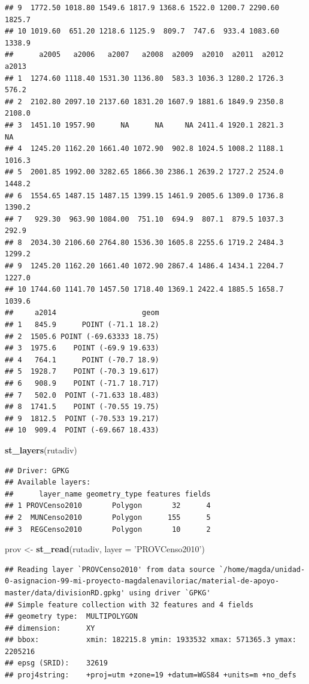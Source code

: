 \documentclass[11pt,]{article}
\newenvironment{Shaded}{\begin{snugshade}}{\end{snugshade}}
\newcommand{\KeywordTok}[1]{\textcolor[rgb]{0.13,0.29,0.53}{\textbf{#1}}}
\newcommand{\DataTypeTok}[1]{\textcolor[rgb]{0.13,0.29,0.53}{#1}}
\newcommand{\StringTok}[1]{\textcolor[rgb]{0.31,0.60,0.02}{#1}}
\newcommand{\NormalTok}[1]{#1}
\begin{document}
\begin{verbatim}
## 9  1772.50 1018.80 1549.6 1817.9 1368.6 1522.0 1200.7 2290.60 1825.7
## 10 1019.60  651.20 1218.6 1125.9  809.7  747.6  933.4 1083.60 1338.9
##      a2005   a2006   a2007   a2008  a2009  a2010  a2011  a2012  a2013
## 1  1274.60 1118.40 1531.30 1136.80  583.3 1036.3 1280.2 1726.3  576.2
## 2  2102.80 2097.10 2137.60 1831.20 1607.9 1881.6 1849.9 2350.8 2108.0
## 3  1451.10 1957.90      NA      NA     NA 2411.4 1920.1 2821.3     NA
## 4  1245.20 1162.20 1661.40 1072.90  902.8 1024.5 1008.2 1188.1 1016.3
## 5  2001.85 1992.00 3282.65 1866.30 2386.1 2639.2 1727.2 2524.0 1448.2
## 6  1554.65 1487.15 1487.15 1399.15 1461.9 2005.6 1309.0 1736.8 1390.2
## 7   929.30  963.90 1084.00  751.10  694.9  807.1  879.5 1037.3  292.9
## 8  2034.30 2106.60 2764.80 1536.30 1605.8 2255.6 1719.2 2484.3 1299.2
## 9  1245.20 1162.20 1661.40 1072.90 2867.4 1486.4 1434.1 2204.7 1227.0
## 10 1744.60 1141.70 1457.50 1718.40 1369.1 2422.4 1885.5 1658.7 1039.6
##     a2014                    geom
## 1   845.9      POINT (-71.1 18.2)
## 2  1505.6 POINT (-69.63333 18.75)
## 3  1975.6    POINT (-69.9 19.633)
## 4   764.1      POINT (-70.7 18.9)
## 5  1928.7    POINT (-70.3 19.617)
## 6   908.9    POINT (-71.7 18.717)
## 7   502.0  POINT (-71.633 18.483)
## 8  1741.5    POINT (-70.55 19.75)
## 9  1812.5  POINT (-70.533 19.217)
## 10  909.4  POINT (-69.667 18.433)
\end{verbatim}

\begin{Shaded}
\begin{Highlighting}[]
\KeywordTok{st_layers}\NormalTok{(rutadiv)}
\end{Highlighting}
\end{Shaded}

\begin{verbatim}
## Driver: GPKG 
## Available layers:
##      layer_name geometry_type features fields
## 1 PROVCenso2010       Polygon       32      4
## 2  MUNCenso2010       Polygon      155      5
## 3  REGCenso2010       Polygon       10      2
\end{verbatim}

\begin{Shaded}
\begin{Highlighting}[]
\NormalTok{prov <-}\StringTok{ }\KeywordTok{st_read}\NormalTok{(rutadiv, }\DataTypeTok{layer =} \StringTok{'PROVCenso2010'}\NormalTok{)}
\end{Highlighting}
\end{Shaded}

\begin{verbatim}
## Reading layer `PROVCenso2010' from data source `/home/magda/unidad-0-asignacion-99-mi-proyecto-magdalenaviloriac/material-de-apoyo-master/data/divisionRD.gpkg' using driver `GPKG'
## Simple feature collection with 32 features and 4 fields
## geometry type:  MULTIPOLYGON
## dimension:      XY
## bbox:           xmin: 182215.8 ymin: 1933532 xmax: 571365.3 ymax: 2205216
## epsg (SRID):    32619
## proj4string:    +proj=utm +zone=19 +datum=WGS84 +units=m +no_defs
\end{verbatim}
\end{document}
